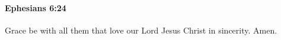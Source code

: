 		\paragraph{Ephesians 6:24} %
			\label{EPHESIANS-6-24}

			Grace be with all them that love our Lord Jesus Christ in sincerity.  Amen.

			\begin{framed}
			\scriptsize
				\begin{compactdesc}
					\item[SBLG] 
				\end{compactdesc}
			\end{framed}